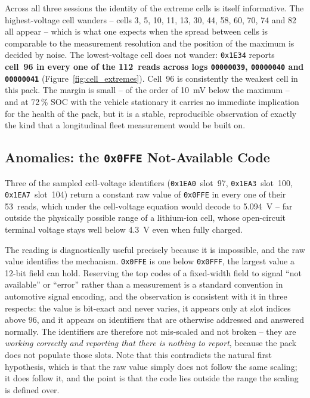 \documentclass[11pt,a4paper,oneside,parskip=half]{scrreprt}
\providecommand{\hex}{}\renewcommand{\hex}[1]{\texttt{0x#1}}
\begin{document}
Across all three sessions the identity of the extreme cells is itself informative. The highest-voltage cell wanders -- cells 3, 5, 10, 11, 13, 30, 44, 58, 60, 70, 74 and 82 all appear -- which is what one expects when the spread between cells is comparable to the measurement resolution and the position of the maximum is decided by noise. The lowest-voltage cell does not wander: \hex{1E34} reports \textbf{cell~96 in every one of the 112~reads across logs \texttt{00000039}, \texttt{00000040} and \texttt{00000041}} (Figure~\ref{fig:cell_extremes}). Cell~96 is consistently the weakest cell in this pack. The margin is small -- of the order of 10~mV below the maximum -- and at 72\,\% SOC with the vehicle stationary it carries no immediate implication for the health of the pack, but it is a stable, reproducible observation of exactly the kind that a longitudinal fleet measurement would be built on.

\subsection{Anomalies: the \hex{0FFE} Not-Available Code}
\label{ssec:anomalies}
Three of the sampled cell-voltage identifiers (\hex{1EA0}~slot~97, \hex{1EA3}~slot~100, \hex{1EA7}~slot~104) return a constant raw value of \hex{0FFE} in every one of their 53~reads, which under the cell-voltage equation would decode to 5.094~V -- far outside the physically possible range of a lithium-ion cell, whose open-circuit terminal voltage stays well below 4.3~V even when fully charged.

The reading is diagnostically useful precisely because it is impossible, and the raw value identifies the mechanism. \hex{0FFE} is one below \hex{0FFF}, the largest value a 12-bit field can hold. Reserving the top codes of a fixed-width field to signal ``not available'' or ``error'' rather than a measurement is a standard convention in automotive signal encoding, and the observation is consistent with it in three respects: the value is bit-exact and never varies, it appears only at slot indices above 96, and it appears on identifiers that are otherwise addressed and answered normally. The identifiers are therefore not mis-scaled and not broken -- they are \emph{working correctly and reporting that there is nothing to report}, because the pack does not populate those slots. Note that this contradicts the natural first hypothesis, which is that the raw value simply does not follow the same scaling; it does follow it, and the point is that the code lies outside the range the scaling is defined over.
\end{document}
